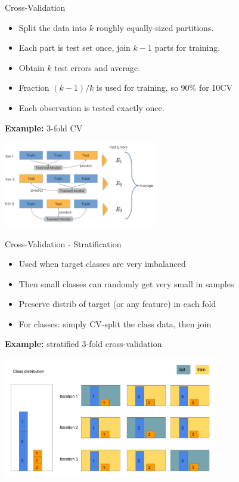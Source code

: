 \begin{vbframe}{Cross-Validation}

\begin{itemize}
  \item Split the data into $k$ roughly equally-sized partitions.
  \item Each part is test set once, join $k-1$ parts for training.
  \item Obtain $k$ test errors and average.
  \item Fraction $(k-1)/k$ is used for training, so 90\% for 10CV
  \item Each observation is tested exactly once.
\end{itemize}

\lz

\textbf{Example:} 3-fold CV

\begin{center}
\includegraphics[width=0.5\textwidth]{figure_man/crossvalidation.png}
\end{center}
\end{vbframe}

\begin{vbframe}{Cross-Validation - Stratification}

\begin{itemize}
    \item Used when target classes are very imbalanced
    \item Then small classes can randomly get very small in samples   
    \item Preserve distrib of target (or any feature) in each fold
    \item For classes: simply CV-split the class data, then join
\end{itemize}

\lz

\textbf{Example:} stratified 3-fold cross-validation
\begin{center}
\includegraphics[width=0.7\textwidth]{figure/eval_resample_1} 
\end{center}
\end{vbframe}



